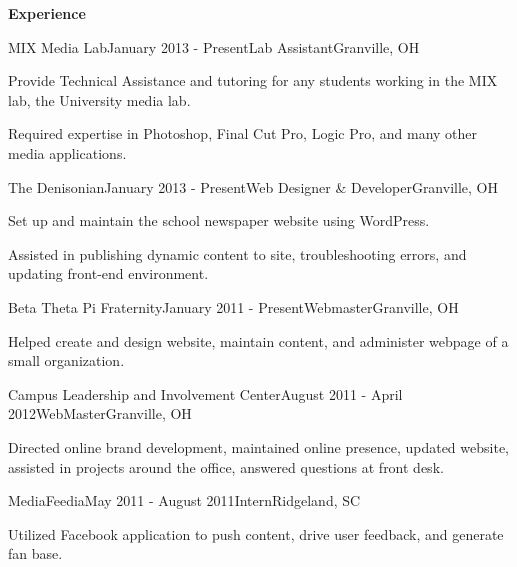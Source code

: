 \documentclass{resume} %
\begin{document}
\begin{rSection}{\bf Experience}

\begin{rSubsection}{MIX Media Lab}{January 2013 - Present}{Lab Assistant}{Granville, OH}
\item Provide Technical Assistance and tutoring for any students working in the MIX lab, the University media lab.
\item Required expertise in Photoshop, Final Cut Pro, Logic Pro, and many other media applications.
\end{rSubsection}


\begin{rSubsection}{The Denisonian}{January 2013 - Present}{Web Designer \& Developer}{Granville, OH}
\item Set up and maintain the school newspaper website using WordPress.
\item Assisted in publishing dynamic content to site, troubleshooting errors, and updating front-end environment.
\end{rSubsection}


\begin{rSubsection}{Beta Theta Pi Fraternity}{January 2011 - Present}{Webmaster}{Granville, OH}
\item Helped create and design website, maintain content, and administer webpage of a small organization. 
\end{rSubsection}



\begin{rSubsection}{Campus Leadership and Involvement Center}{August 2011 - April 2012}{WebMaster}{Granville, OH}
\item Directed online brand development, maintained online presence, updated website, assisted in projects around the office, answered questions at front desk.\end{rSubsection}


\begin{rSubsection}{MediaFeedia}{May 2011 - August 2011}{Intern}{Ridgeland, SC}
\item Utilized Facebook application to push content, drive user feedback, and generate fan base.
\end{rSubsection}



\end{rSection}
\end{document}
